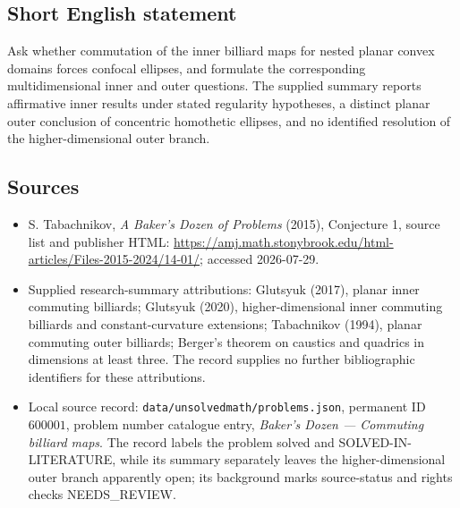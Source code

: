\documentclass[11pt]{article}
\begin{document}
\subsection{Short English statement}
Ask whether commutation of the inner billiard maps for nested planar convex domains forces confocal ellipses, and formulate the corresponding multidimensional inner and outer questions. The supplied summary reports affirmative inner results under stated regularity hypotheses, a distinct planar outer conclusion of concentric homothetic ellipses, and no identified resolution of the higher-dimensional outer branch.
\subsection{Sources}
\begin{itemize}
\item S. Tabachnikov, \emph{A Baker's Dozen of Problems} (2015), Conjecture 1, source list and publisher HTML: \url{https://amj.math.stonybrook.edu/html-articles/Files-2015-2024/14-01/}; accessed 2026-07-29.
\item Supplied research-summary attributions: Glutsyuk (2017), planar inner commuting billiards; Glutsyuk (2020), higher-dimensional inner commuting billiards and constant-curvature extensions; Tabachnikov (1994), planar commuting outer billiards; Berger's theorem on caustics and quadrics in dimensions at least three. The record supplies no further bibliographic identifiers for these attributions.
\item Local source record: \texttt{data/unsolvedmath/problems.json}, permanent ID $600001$, problem number catalogue entry, \emph{Baker's Dozen --- Commuting billiard maps}. The record labels the problem solved and SOLVED-IN-LITERATURE, while its summary separately leaves the higher-dimensional outer branch apparently open; its background marks source-status and rights checks NEEDS\_REVIEW.
\end{itemize}
\end{document}
